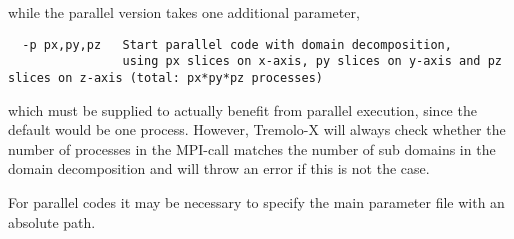 
while the parallel version takes one additional parameter,
\begin{lstlisting}
  -p px,py,pz   Start parallel code with domain decomposition,
                using px slices on x-axis, py slices on y-axis and pz slices on z-axis (total: px*py*pz processes)
\end{lstlisting}
which must be supplied to actually benefit from parallel execution, since the default would be one process.
However, Tremolo-X will always check whether the number of processes in the MPI-call matches the number
of sub domains in the domain decomposition and will throw an error if this is not the case.


For parallel codes it may be necessary to specify the main parameter file
with an absolute path.

